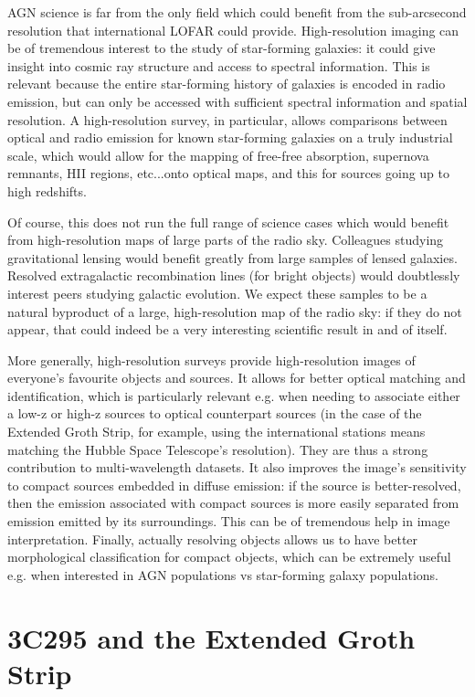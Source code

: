\pg
AGN science is far from the only field which could benefit from the sub-arcsecond resolution that international LOFAR could provide. High-resolution imaging can be of tremendous interest to the study of star-forming galaxies: it could give insight into cosmic ray structure and access to spectral information. This is relevant because the entire star-forming history of galaxies is encoded in radio emission, but can only be accessed with sufficient spectral information and spatial resolution. A high-resolution survey, in particular, allows comparisons between optical and radio emission for known star-forming galaxies on a truly industrial scale, which would allow for the mapping of free-free absorption, supernova remnants, HII regions, etc...onto optical maps, and this for sources going up to high redshifts.

\pg
Of course, this does not run the full range of science cases which would benefit from high-resolution maps of large parts of the radio sky. Colleagues studying gravitational lensing would benefit greatly from large samples of lensed galaxies. Resolved extragalactic recombination lines (for bright objects) would doubtlessly interest peers studying galactic evolution. We expect these samples to be a natural byproduct of a large, high-resolution map of the radio sky: if they do not appear, that could indeed be a very interesting scientific result in and of itself.

\pg
More generally, high-resolution surveys provide high-resolution images of everyone's favourite objects and sources. It allows for better optical matching and identification, which is particularly relevant e.g. when needing to associate either a low-z or high-z sources to optical counterpart sources (in the case of the Extended Groth Strip, for example, using the international stations means matching the Hubble Space Telescope's resolution). They are thus a strong contribution to multi-wavelength datasets. It also improves the image's sensitivity to compact sources embedded in diffuse emission: if the source is better-resolved, then the emission associated with compact sources is more easily separated from emission emitted by its surroundings. This can be of tremendous help in image interpretation. Finally, actually resolving objects allows us to have better morphological classification for compact objects, which can be extremely useful e.g. when interested in AGN populations vs star-forming galaxy populations.




\section{3C295 and the Extended Groth Strip}

